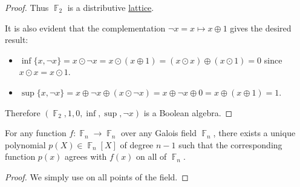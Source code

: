 \begin{proof}
  Thus \( \BbbF_2 \) is a distributive \hyperref[def:distributive_lattice]{lattice}.

  It is also evident that the complementation \( \neg x = x \mapsto x \oplus 1 \) gives the desired result:
  \begin{itemize}
    \item \( \inf \{ x, \neg x \} = x \odot \neg x = x \odot (x \oplus 1) = (x \odot x) \oplus (x \odot 1) = 0 \) since \( x \odot x = x \odot 1 \).
    \item \( \sup \{ x, \neg x \} = x \oplus \neg x \oplus (x \odot \neg x) = x \oplus \neg x \oplus 0 = x \oplus (x \oplus 1) = 1 \).
  \end{itemize}

  Therefore \( (\BbbF_2, 1, 0, \inf, \sup, \neg x ) \) is a Boolean algebra.
\end{proof}

\begin{proposition}
  For any function \( f: \BbbF_n \to \BbbF_n \) over any Galois field \( \BbbF_n \), there exists a unique polynomial \( p(X) \in \BbbF_n[X] \) of degree \( n - 1 \) such that the corresponding function \( p(x) \) agrees with \( f(x) \) on all of \( \BbbF_n \).
\end{proposition}
\begin{proof}
  We simply use  on all points of the field.
\end{proof}

